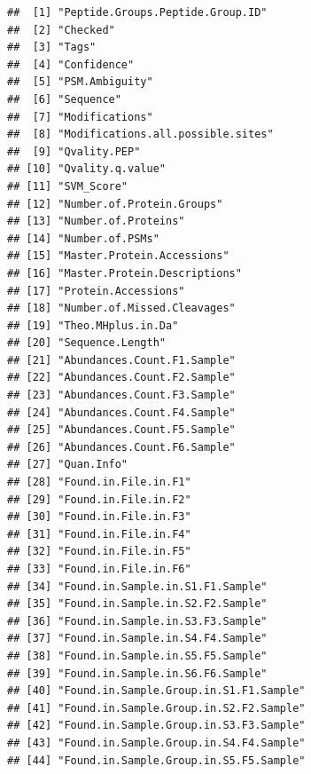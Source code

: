 \documentclass[9pt,a4paper,]{extarticle}
\begin{document}
\begin{verbatim}
##  [1] "Peptide.Groups.Peptide.Group.ID"                
##  [2] "Checked"                                        
##  [3] "Tags"                                           
##  [4] "Confidence"                                     
##  [5] "PSM.Ambiguity"                                  
##  [6] "Sequence"                                       
##  [7] "Modifications"                                  
##  [8] "Modifications.all.possible.sites"               
##  [9] "Qvality.PEP"                                    
## [10] "Qvality.q.value"                                
## [11] "SVM_Score"                                      
## [12] "Number.of.Protein.Groups"                       
## [13] "Number.of.Proteins"                             
## [14] "Number.of.PSMs"                                 
## [15] "Master.Protein.Accessions"                      
## [16] "Master.Protein.Descriptions"                    
## [17] "Protein.Accessions"                             
## [18] "Number.of.Missed.Cleavages"                     
## [19] "Theo.MHplus.in.Da"                              
## [20] "Sequence.Length"                                
## [21] "Abundances.Count.F1.Sample"                     
## [22] "Abundances.Count.F2.Sample"                     
## [23] "Abundances.Count.F3.Sample"                     
## [24] "Abundances.Count.F4.Sample"                     
## [25] "Abundances.Count.F5.Sample"                     
## [26] "Abundances.Count.F6.Sample"                     
## [27] "Quan.Info"                                      
## [28] "Found.in.File.in.F1"                            
## [29] "Found.in.File.in.F2"                            
## [30] "Found.in.File.in.F3"                            
## [31] "Found.in.File.in.F4"                            
## [32] "Found.in.File.in.F5"                            
## [33] "Found.in.File.in.F6"                            
## [34] "Found.in.Sample.in.S1.F1.Sample"                
## [35] "Found.in.Sample.in.S2.F2.Sample"                
## [36] "Found.in.Sample.in.S3.F3.Sample"                
## [37] "Found.in.Sample.in.S4.F4.Sample"                
## [38] "Found.in.Sample.in.S5.F5.Sample"                
## [39] "Found.in.Sample.in.S6.F6.Sample"                
## [40] "Found.in.Sample.Group.in.S1.F1.Sample"          
## [41] "Found.in.Sample.Group.in.S2.F2.Sample"          
## [42] "Found.in.Sample.Group.in.S3.F3.Sample"          
## [43] "Found.in.Sample.Group.in.S4.F4.Sample"          
## [44] "Found.in.Sample.Group.in.S5.F5.Sample"          

\end{verbatim}
\end{document}
